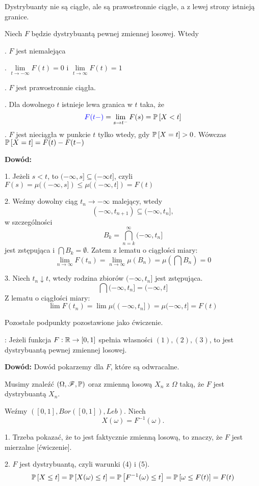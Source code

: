 Dystrybuanty nie są ciągłe, ale są prawostronnie ciągłe, a z lewej strony istnieją granice.

 Niech $F$ będzie dystrybuantą pewnej zmiennej losowej. Wtedy

. $F$ jest niemalejąca

. $\lim\limits_{t\to-\infty}F(t)=0$ i $\lim\limits_{t\to\infty}F(t)=1$

. $F$ jest prawostronnie ciągła.

. Dla dowolnego $t$ istnieje lewa granica w $t$ taka, że
$${\color{blue}F(t-)}=\lim\limits_{s\to t^-}F(s)=\mathbb{P}\left[X<t\right]$$
. $F$ jest nieciągła w punkcie $t$ tylko wtedy, gdy $\mathbb{P}\left[X=t\right]>0$. Wówczas $\mathbb{P}\left[X=t\right]=F(t)-F(t-)$

\textbf{Dowód:}

1. Jeżeli $s<t$, to $(-\infty, s]\subseteq(-\infty t]$, czyli $F(s)=\mu((-\infty,s])\leq\mu((-\infty,t])=F(t)$

2. Weźmy dowolny ciąg $t_n\to-\infty$ malejący, wtedy
$$(-\infty, t_{n+1})\subseteq(-\infty,t_n],$$
w szczególności
$$B_k=\bigcap\limits_{n=k}^\infty(-\infty,t_n]$$
jest zstępująca i $\bigcap B_k=\emptyset$. Zatem z lematu o ciągłości miary:
$$\lim\limits_{n\to\infty}F(t_n)=\lim\limits_{n\to\infty}\mu(B_n)=\mu(\bigcap B_n)=0$$

3. Niech $t_n\downarrow t$, wtedy rodzina zbiorów $(-\infty, t_n]$ jest zstępująca. 
$$\bigcap (-\infty, t_n]=(-\infty, t]$$
Z lematu o ciągłości miary:
$$\lim F(t_n)=\lim \mu((-\infty, t_n])=\mu(-\infty, t]=F(t)$$

Pozostałe podpunkty pozostawione jako ćwiczenie.
\medskip

: Jeżeli funkcja $F:\mathbb{R}\to[0,1]$ spełnia własności $(1), (2), (3)$, to jest dystrybuantą pewnej zmiennej losowej.

\textbf{Dowód:} Dowód pokarzemy dla $F$, które są odwracalne.

Musimy znaleźć $(\Omega,\mathcal{F},\mathbb{P})$ oraz zmienną losową $X_n$ z $\Omega$ taką, że $F$ jest dystrybuantą $X_n$.

Weźmy $([0,1],Bor([0,1]), Leb)$. Niech 
$$X(\omega)=F^{-1}(\omega).$$

1. Trzeba pokazać, że to jest faktycznie zmienną losową, to znaczy, że $F$ jest mierzalne [ćwiczenie].

2. $F$ jest dystrybuantą, czyli warunki (4) i (5).
\begin{align*}
    \mathbb{P}\left[X\leq t\right]=\mathbb{P}\left[X(\omega)\leq t\right]=\mathbb{P}\left[F^{-1}(\omega)\leq t\right]=\mathbb{P}\left[\omega\leq F(t)\right]=F(t)
\end{align*}

